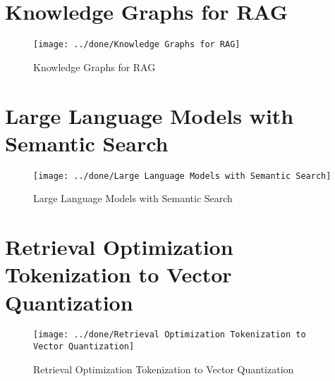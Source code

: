 \documentclass[a4paper,12pt]{article}
\begin{document}
\section*{Knowledge Graphs for RAG}
\vspace{-10pt} %
\begin{figure}[h]
	\centering
	\vspace{-10pt} %
	\texttt{[image: ../done/Knowledge Graphs for RAG]}
	\vspace{-10pt} %
	\caption{Knowledge Graphs for RAG}
	\vspace{-10pt} %
\end{figure}


\newpage
\section*{Large Language Models with Semantic Search}
\vspace{-10pt} %
\begin{figure}[h]
	\centering
	\vspace{-10pt} %
	\texttt{[image: ../done/Large Language Models with Semantic Search]}
	\vspace{-10pt} %
	\caption{Large Language Models with Semantic Search}
	\vspace{-10pt} %
\end{figure}


\section*{Retrieval Optimization Tokenization to Vector Quantization}
\vspace{-10pt} %
\begin{figure}[h]
	\centering
	\vspace{-10pt} %
	\texttt{[image: ../done/Retrieval Optimization Tokenization to Vector Quantization]}
	\vspace{-10pt} %
	\caption{Retrieval Optimization Tokenization to Vector Quantization}
	\vspace{-10pt} %
\end{figure}
\newpage
\end{document}
